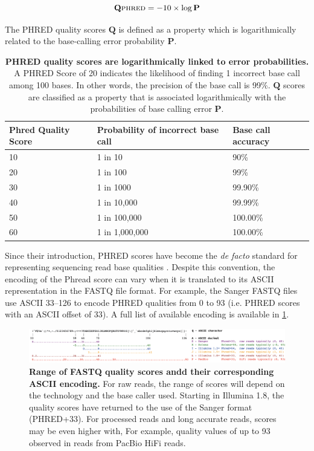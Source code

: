 \begin{equation}
\centering
\mathbf{Q}\textsc{phred} = - 10 \times \log \mathbf{P}
\end{equation}
 
The PHRED quality scores $\mathbf{Q}$ is defined as a property which is logarithmically related to the base-calling error probability $\mathbf{P}$.

\begin{table}[h!]
\caption{\textbf{PHRED quality scores are logarithmically linked to error probabilities.} A PHRED Score of 20 indicates the likelihood of finding 1 incorrect base call among 100 bases. In other words, the precision of the base call is 99\%. $\mathbf{Q}$ scores are classified as a property that is associated logarithmically with the probabilities of base calling error $\mathbf{P}$.} \label{tab:phred_error}
\begin{tabular}{@{}lll@{}}
\toprule
\textbf{Phred Quality Score} & \textbf{Probability of incorrect base call} & \textbf{Base call accuracy} \\ \midrule
10 & 1 in 10        & 90\%     \\
20 & 1 in 100       & 99\%     \\
30 & 1 in 1000      & 99.90\%  \\
40 & 1 in 10,000    & 99.99\%  \\
50 & 1 in 100,000   & 100.00\% \\
60 & 1 in 1,000,000 & 100.00\% \\ \bottomrule
\end{tabular}
\end{table}

Since their introduction, PHRED scores have become the \textit{de facto} standard for representing sequencing read base qualities \citep{cock_sanger_2010}. Despite this convention, the encoding of the Phread score can vary when it is translated to its ASCII representation in the FASTQ file format. For example, the Sanger FASTQ files use ASCII 33–126 to encode PHRED qualities from 0 to 93 (i.e. PHRED scores with an ASCII offset of 33). A full list of available encoding is available in \ref{fig:figure6}. 

\begin{figure}[h!]
\centering
\includegraphics[width=\textwidth]{figures/introduction/Figure 6.png}
\caption{\textbf{Range of FASTQ quality scores andd their corresponding ASCII encoding.} For raw reads, the range of scores will depend on the technology and the base caller used. Starting in Illumina 1.8, the quality scores have returned to the use of the Sanger format (PHRED+33). For processed reads and long accurate reads, scores may be even higher with, For example, quality values of up to 93 observed in reads from PacBio HiFi reads.}
\label{fig:figure6}
\end{figure}

